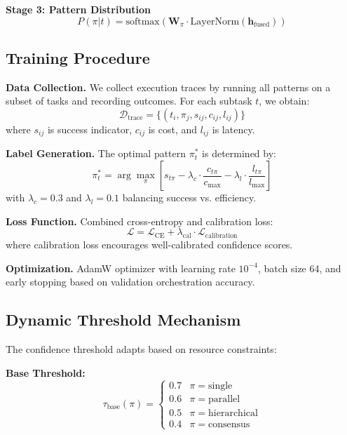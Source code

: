 \documentclass{article}
\theoremstyle{plain}
\theoremstyle{definition}
\theoremstyle{remark}
\begin{document}
\textbf{Stage 3: Pattern Distribution}
\begin{equation}
	P(\pi | t) = \text{softmax}(\mathbf{W}_\pi \cdot \text{LayerNorm}(\mathbf{h}_{\text{fused}}))
\end{equation}

\subsection{Training Procedure}
\label{sec:car_training}

\textbf{Data Collection.} We collect execution traces by running all patterns on a subset of tasks and recording outcomes. For each subtask $t$, we obtain:
\begin{equation}
	\mathcal{D}_{\text{trace}} = \{(t_i, \pi_j, s_{ij}, c_{ij}, l_{ij})\}
\end{equation}
where $s_{ij}$ is success indicator, $c_{ij}$ is cost, and $l_{ij}$ is latency.

\textbf{Label Generation.} The optimal pattern $\pi^*_t$ is determined by:
\begin{equation}
	\pi^*_t = \arg\max_{\pi} \left[ s_{t\pi} - \lambda_c \cdot \frac{c_{t\pi}}{c_{\max}} - \lambda_l \cdot \frac{l_{t\pi}}{l_{\max}} \right]
\end{equation}
with $\lambda_c = 0.3$ and $\lambda_l = 0.1$ balancing success vs. efficiency.

\textbf{Loss Function.} Combined cross-entropy and calibration loss:
\begin{equation}
	\mathcal{L} = \mathcal{L}_{\text{CE}} + \lambda_{\text{cal}} \cdot \mathcal{L}_{\text{calibration}}
\end{equation}
where calibration loss encourages well-calibrated confidence scores.

\textbf{Optimization.} AdamW optimizer with learning rate $10^{-4}$, batch size 64, and early stopping based on validation orchestration accuracy.

\subsection{Dynamic Threshold Mechanism}
\label{sec:car_threshold}

The confidence threshold adapts based on resource constraints:

\textbf{Base Threshold:}
\begin{equation}
	\tau_{\text{base}}(\pi) = \begin{cases}
		0.7 & \pi = \text{single} \\
		0.6 & \pi = \text{parallel} \\
		0.5 & \pi = \text{hierarchical} \\
		0.4 & \pi = \text{consensus}
	\end{cases}
\end{equation}
\end{document}
